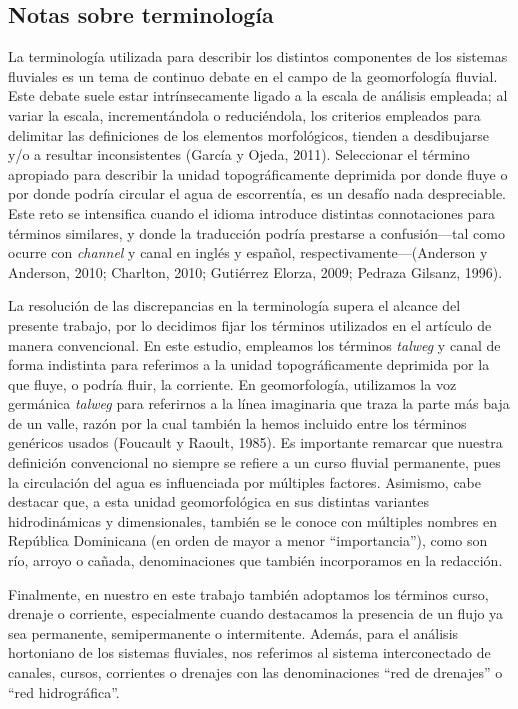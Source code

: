 \documentclass[spanish]{article}
\begin{document}
\hypertarget{notas-sobre-terminologuxeda}{%
\subsection*{Notas sobre
terminología}\label{notas-sobre-terminologuxeda}}

La terminología utilizada para describir los distintos componentes de
los sistemas fluviales es un tema de continuo debate en el campo de la
geomorfología fluvial. Este debate suele estar intrínsecamente ligado a
la escala de análisis empleada; al variar la escala, incrementándola o
reduciéndola, los criterios empleados para delimitar las definiciones de
los elementos morfológicos, tienden a desdibujarse y/o a resultar
inconsistentes (García y Ojeda, 2011). Seleccionar el término apropiado
para describir la unidad topográficamente deprimida por donde fluye o
por donde podría circular el agua de escorrentía, es un desafío nada
despreciable. Este reto se intensifica cuando el idioma introduce
distintas connotaciones para términos similares, y donde la traducción
podría prestarse a confusión---tal como ocurre con \emph{channel} y
canal en inglés y español, respectivamente---(Anderson y Anderson, 2010;
Charlton, 2010; Gutiérrez Elorza, 2009; Pedraza Gilsanz, 1996).

La resolución de las discrepancias en la terminología supera el alcance
del presente trabajo, por lo decidimos fijar los términos utilizados en
el artículo de manera convencional. En este estudio, empleamos los
términos \emph{talweg} y canal de forma indistinta para referimos a la
unidad topográficamente deprimida por la que fluye, o podría fluir, la
corriente. En geomorfología, utilizamos la voz germánica \emph{talweg}
para referirnos a la línea imaginaria que traza la parte más baja de un
valle, razón por la cual también la hemos incluido entre los términos
genéricos usados (Foucault y Raoult, 1985). Es importante remarcar que
nuestra definición convencional no siempre se refiere a un curso fluvial
permanente, pues la circulación del agua es influenciada por múltiples
factores. Asimismo, cabe destacar que, a esta unidad geomorfológica en
sus distintas variantes hidrodinámicas y dimensionales, también se le
conoce con múltiples nombres en República Dominicana (en orden de mayor
a menor ``importancia''), como son río, arroyo o cañada, denominaciones
que también incorporamos en la redacción.

Finalmente, en nuestro en este trabajo también adoptamos los términos
curso, drenaje o corriente, especialmente cuando destacamos la presencia
de un flujo ya sea permanente, semipermanente o intermitente. Además,
para el análisis hortoniano de los sistemas fluviales, nos referimos al
sistema interconectado de canales, cursos, corrientes o drenajes con las
denominaciones ``red de drenajes'' o ``red hidrográfica''.
\end{document}
